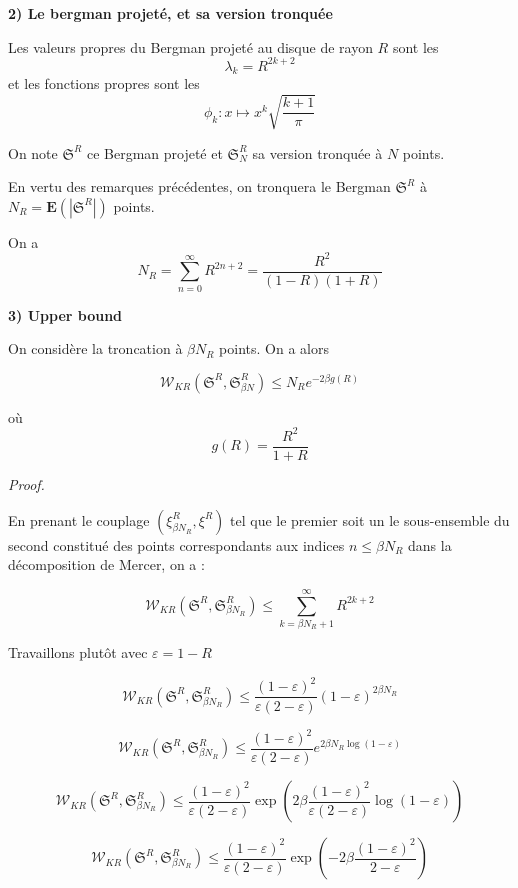 \documentclass[11pt]{article}
\let\oldsum\sum
\renewcommand{\sum}{\oldsum\limits}
\begin{document}
\textbf{2) Le bergman projeté, et sa version tronquée}

Les valeurs propres du Bergman projeté au disque de rayon $R$ sont les $$ \lambda_k = R^{2k + 2} $$ et les fonctions propres sont les $$ \phi_k : x \mapsto x^k \sqrt{ \frac{k+1}{\pi}} $$ 

On note $ \mathfrak S^R $ ce Bergman projeté et $ \mathfrak S^R_{N} $ sa version tronquée à $ N $ points.

En vertu des remarques précédentes, on tronquera le Bergman $ \mathfrak S^R $ à $ N_R = \mathbf E ( |\mathfrak S^R| ) $ points.

On a $$ N_R = \sum_{n=0}^\infty R^{2n+ 2} = \frac{R^2}{(1-R)(1+R)}$$

\newpage

\textbf{3) Upper bound}

On considère la troncation à $ \beta N_R $ points. On a alors

$$ \mathcal W_{KR}(\mathfrak S^R, \mathfrak S^R_{\beta N} ) \leqslant N_R e^{-2 \beta g(R)} $$

où $$ g(R) = \frac{R^2}{1+R} $$ 

\textit{Proof.}

En prenant le couplage $ (\xi^R_{ \beta N_R}, \xi^R) $ tel que le premier soit un le sous-ensemble du second constitué des points correspondants aux indices $ n \leqslant \beta N_R$ dans la décomposition de Mercer, on a :

$$ \mathcal W_{KR}(\mathfrak S^R, \mathfrak S^R_{\beta N_R} ) \leqslant \sum_{k= \beta N_R + 1 }^\infty R^{2k + 2} $$

Travaillons plutôt avec $ \varepsilon = 1 - R $ 

$$ \mathcal W_{KR}(\mathfrak S^R, \mathfrak S^R_{\beta N_R} ) \leqslant \frac{(1-\varepsilon)^2}{\varepsilon (2- \varepsilon)} (1-\varepsilon)^{2 \beta N_R} $$

$$ \mathcal W_{KR}(\mathfrak S^R, \mathfrak S^R_{\beta N_R} ) \leqslant \frac{(1-\varepsilon)^2}{\varepsilon (2- \varepsilon)} e^{2 \beta N_R \log (1-\varepsilon)} $$

$$ \mathcal W_{KR}(\mathfrak S^R, \mathfrak S^R_{\beta N_R} ) \leqslant \frac{(1-\varepsilon)^2}{\varepsilon (2- \varepsilon)} \exp \left( 2 \beta \frac{(1-\varepsilon)^2}{\varepsilon (2-\varepsilon)} \log (1-\varepsilon) \right) $$

$$ \mathcal W_{KR}(\mathfrak S^R, \mathfrak S^R_{\beta N_R} ) \leqslant \frac{(1-\varepsilon)^2}{\varepsilon (2- \varepsilon)} \exp \left( - 2 \beta \frac{(1-\varepsilon)^2}{ 2-\varepsilon } \right) $$
\end{document}
